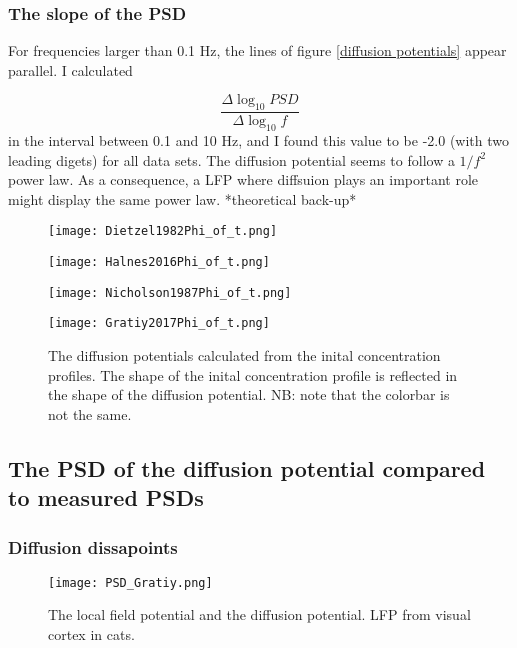 \documentclass{article}
\begin{document}
\subsubsection{The slope of the PSD}
For frequencies larger than 0.1 Hz, the lines of figure \ref{diffusion potentials} appear  parallel. I calculated 

$$\frac{\Delta\log_{10}PSD}{\Delta \log_{10}f}$$
in the interval between 0.1 and 10 Hz, and I found this value to be -2.0 (with two leading digets) for all data sets. The diffusion potential seems to follow a $1/f^2$ power law. As a consequence, a LFP where diffsuion plays an important role might display the same power law.  *theoretical back-up*




\begin{figure}[!tbp]
  \centering
  \begin{minipage}[b]{0.45\textwidth}
    \texttt{[image: Dietzel1982Phi\_of\_t.png]}
  \end{minipage}
  \hfill
  \begin{minipage}[b]{0.45\textwidth}
    \texttt{[image: Halnes2016Phi\_of\_t.png]}
  \end{minipage}
    \begin{minipage}[b]{0.45\textwidth}
    \texttt{[image: Nicholson1987Phi\_of\_t.png]}
  \end{minipage}
  \hfill
  \begin{minipage}[b]{0.45\textwidth}
    \texttt{[image: Gratiy2017Phi\_of\_t.png]}
  \end{minipage}
  \caption{The diffusion potentials calculated from the inital concentration profiles. The shape of the inital concentration profile is reflected in the shape of the diffusion potential. NB: note that the colorbar is not the same.}
  \label{fig:contours}
\end{figure} 


\subsection{The PSD of the diffusion potential compared to measured PSDs}
\subsubsection{Diffusion dissapoints}

\begin{figure}
  \texttt{[image: PSD\_Gratiy.png]}
  \caption{The local field potential and the diffusion potential. LFP from visual cortex in cats.}
  \label{fig:PSD_Gratiy}
\end{figure}
\end{document}
